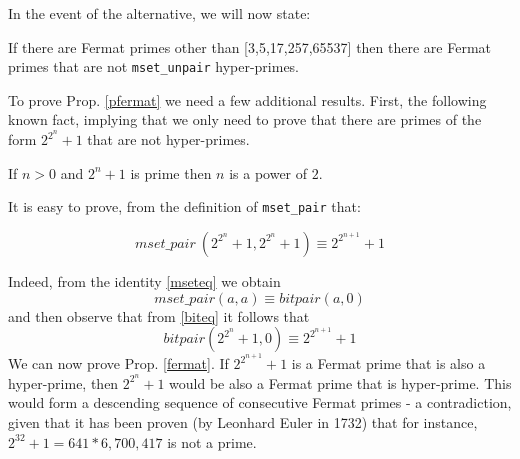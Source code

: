 \documentclass[]{INCLUDES/llncs}
\begin{document}
In the event of the alternative, we will now state:
\begin{prop} \label{pfermat}
If there are Fermat primes other than [3,5,17,257,65537] then there are
Fermat primes that are not  {\tt mset\_unpair} hyper-primes.
\end{prop}
To prove Prop. \ref{pfermat} we need a few additional results.
First, the following known fact, implying that we only need to prove that there
are primes of the form $2^{2^n}+1$ that are not hyper-primes.
\begin{lem}
If $n>0$ and $2^n+1$ is prime then $n$ is a power of $2$. 
\end{lem}
It is easy to prove, from the definition of {\tt mset\_pair} that:
\begin{lem}
\begin{equation}
mset\_pair~(2^{2^n}+1,2^{2^n}+1) \equiv 2^{2^{n+1}}+1
\end{equation}
\end{lem}
Indeed, from the identity \ref{mseteq} we obtain
\begin{equation}
mset\_pair (a,a) \equiv bitpair (a,0)
\end{equation}
and then observe that from \ref{biteq} it follows that
\begin{equation}
bitpair (2^{2^n}+1,0) \equiv 2^{2^{n+1}}+1
\end{equation}
We can now prove Prop. \ref{fermat}.
If $2^{2^{n+1}}+1$ is a Fermat prime that is also a
hyper-prime, then $2^{2^{n}}+1$ would be also a Fermat prime that is hyper-prime.
This would form a descending sequence of consecutive Fermat primes - a
contradiction, given that it has been proven (by Leonhard Euler in 1732) that
for instance, $2^{32}+1 = 641 * 6,700,417$ is not a prime.
\end{document}
